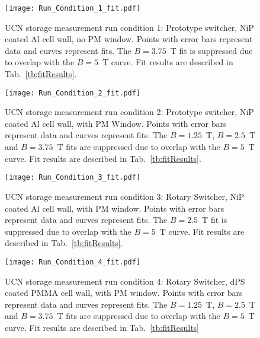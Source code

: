 \begin{figure}
    \centering
    \texttt{[image: Run\_Condition\_1\_fit.pdf]}
    \caption[UCN storage measurement run condition 1: Prototype switcher, NiP coated Al cell wall, no PM window.]{UCN storage measurement run condition 1: Prototype switcher, NiP coated Al cell wall, no PM window. Points with error bars represent data and curves represent fits. The $B=3.75$~T fit is suppressed due to overlap with the $B=5$~T curve. Fit results are described in Tab.~\ref{tb:fitResults}.}
    \label{fig:runCondition1_fit}
\end{figure}

\begin{figure}
    \centering
    \texttt{[image: Run\_Condition\_2\_fit.pdf]}
    \caption[UCN storage measurement run condition 2: Prototype switcher, NiP coated Al cell wall, with PM Window.]{UCN storage measurement run condition 2: Prototype switcher, NiP coated Al cell wall, with PM Window. Points with error bars represent data and curves represent fits. The $B=1.25$~T, $B=2.5$~T and $B=3.75$~T fits are suppressed due to overlap with the $B=5$~T curve. Fit results are described in Tab.~\ref{tb:fitResults}.}
    \label{fig:runCondition2_fit}
\end{figure}

\begin{figure}
    \centering
    \texttt{[image: Run\_Condition\_3\_fit.pdf]}
    \caption[UCN storage measurement run condition 3: Rotary Switcher, NiP coated Al cell wall, with PM window.]{UCN storage measurement run condition 3: Rotary Switcher, NiP coated Al cell wall, with PM window. Points with error bars represent data and curves represent fits. The $B=2.5$~T fit is suppressed due to overlap with the $B=5$~T curve. Fit results are described in Tab.~\ref{tb:fitResults}.}
    \label{fig:runCondition3_fit}
\end{figure}

\begin{figure}
    \centering
    \texttt{[image: Run\_Condition\_4\_fit.pdf]}
    \caption[UCN storage measurement run condition 4: Rotary Switcher, dPS coated PMMA cell wall, with PM window.]{UCN storage measurement run condition 4: Rotary Switcher, dPS coated PMMA cell wall, with PM window. Points with error bars represent data and curves represent fits. The $B=1.25$~T, $B=2.5$~T and $B=3.75$~T fits are suppressed due to overlap with the $B=5$~T curve. Fit results are described in Tab.~\ref{tb:fitResults}}
    \label{fig:runCondition4_fit}
\end{figure}

